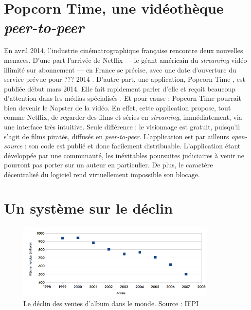 \documentclass[a4paper]{report}
\begin{document}
	\section{Popcorn Time, une vidéothèque \emph{peer-to-peer}}
	En avril 2014, l'industrie cinématrographique française rencontre deux nouvelles menaces. D'une part l'arrivée de Netflix — le géant américain du \emph{streaming} vidéo illimité sur abonnement — en France se précise, avec une date d'ouverture du service prévue pour ??? 2014  \cite{netflix-date-france} . D'autre part, une application, Popcorn Time  \cite{popcorn-time}, est publiée début mars 2014. Elle fait rapidement parler d'elle et reçoit beaucoup d'attention dans les médias spécialisés \cite{popcorn-time-article}. Et pour cause : Popcorn Time pourrait bien devenir le Napster de la vidéo. En effet, cette application propose, tout comme Netflix, de regarder des films et séries en \emph{streaming}, immédiatement, via une interface très intuitive. Seule différence : le visionnage est gratuit, puisqu'il s'agit de films piratés, diffusés en \emph{peer-to-peer}. L'application est par ailleurs \emph{open-source} : son code est publié \cite{popcorn-time-github} et donc facilement distribuable. L'application étant développée par une communauté, les inévitables poursuites judiciaires à venir ne pourront pas porter sur un auteur en particulier. De plus, le caractère décentralisé du logiciel rend virtuellement impossible son blocage.

	\section{Un système sur le déclin}
	\label{declin-systeme}

	\begin{figure}[ht]
		\begin{center}
			\includegraphics[width=10cm]{images/ventes-albums.png}
			\caption{Le déclin des ventes d'album dans le monde. Source : IFPI}
		\end{center}
	\end{figure}
\end{document}
